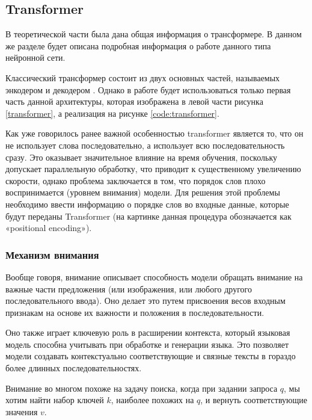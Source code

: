 \newpage
\subsection{Transformer}

В теоретической части была дана общая информация о трансформере. В данном же разделе будет описана подробная информация о работе данного типа нейронной сети.

Классический трансформер состоит из двух основных частей, называемых энкодером и декодером \cite{bib:atten:2}. Однако в работе будет использоваться только первая часть данной архитектуры, которая изображена в левой части рисунка \ref{transformer}, а реализация на рисунке \ref{code:transformer}.




Как уже говорилось ранее важной особенностью transformer является то, что он не использует слова последовательно, а использует всю последовательность сразу. Это оказывает значительное влияние на время обучения, поскольку допускает параллельную обработку, что приводит к существенному увеличению скорости, однако проблема заключается в том, что порядок слов плохо воспринимается (уровнем внимания) модели. Для решения этой проблемы необходимо ввести информацию о порядке слов во входные данные, которые будут переданы Transformer (на картинке данная процедура обозначается как «positional encoding»).

\subsubsection{Механизм внимания}

Вообще говоря, внимание описывает способность модели обращать внимание на важные части предложения (или изображения, или любого другого последовательного ввода). Оно делает это путем присвоения весов входным признакам на основе их важности и положения в последовательности.

Оно также играет ключевую роль в расширении контекста, который языковая модель способна учитывать при обработке и генерации языка. Это позволяет модели создавать контекстуально соответствующие и связные тексты в гораздо более длинных последовательностях.

Внимание во многом похоже на задачу поиска, когда при задании запроса $q$, мы хотим найти набор ключей $k$, наиболее похожих на $q$, и вернуть соответствующие значения $v$.

